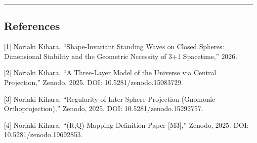 \documentclass[
  a4paper,11pt]{article}
\theoremstyle{definition}
\theoremstyle{remark}
\begin{document}
\begin{center}\rule{0.5\linewidth}{0.5pt}\end{center}

\subsection{References}\label{references}

{[}1{]} Noriaki Kihara, ``Shape-Invariant Standing Waves on Closed
Spheres: Dimensional Stability and the Geometric Necessity of 3+1
Spacetime,'' 2026.

{[}2{]} Noriaki Kihara, ``A Three-Layer Model of the Universe via
Central Projection,'' Zenodo, 2025. DOI: 10.5281/zenodo.15083729.

{[}3{]} Noriaki Kihara, ``Regularity of Inter-Sphere Projection
(Gnomonic Orthoprojection),'' Zenodo, 2025. DOI:
10.5281/zenodo.15292757.

{[}4{]} Noriaki Kihara, ``(R,Q) Mapping Definition Paper {[}M3{]},''
Zenodo, 2025. DOI: 10.5281/zenodo.19692853.
\end{document}
